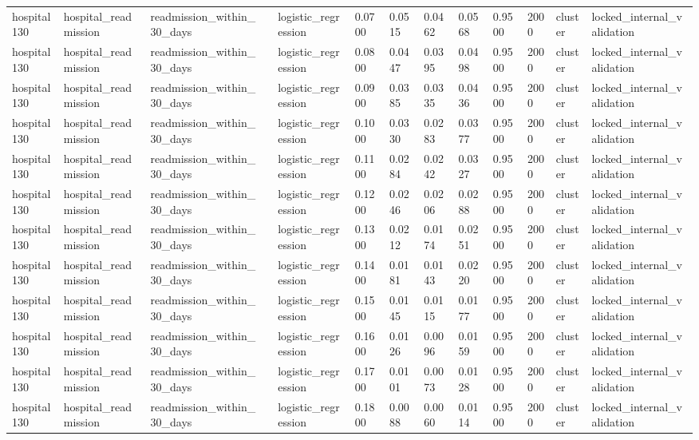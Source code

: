 \begin{tabular}{lllllllllllll}
hospital130 & hospital\_readmission & readmission\_within\_30\_days &  & logistic\_regression & 0.0700 & 0.0515 & 0.0462 & 0.0568 & 0.9500 & 2000 & cluster & locked\_internal\_validation \\
hospital130 & hospital\_readmission & readmission\_within\_30\_days &  & logistic\_regression & 0.0800 & 0.0447 & 0.0395 & 0.0498 & 0.9500 & 2000 & cluster & locked\_internal\_validation \\
hospital130 & hospital\_readmission & readmission\_within\_30\_days &  & logistic\_regression & 0.0900 & 0.0385 & 0.0335 & 0.0436 & 0.9500 & 2000 & cluster & locked\_internal\_validation \\
hospital130 & hospital\_readmission & readmission\_within\_30\_days &  & logistic\_regression & 0.1000 & 0.0330 & 0.0283 & 0.0377 & 0.9500 & 2000 & cluster & locked\_internal\_validation \\
hospital130 & hospital\_readmission & readmission\_within\_30\_days &  & logistic\_regression & 0.1100 & 0.0284 & 0.0242 & 0.0327 & 0.9500 & 2000 & cluster & locked\_internal\_validation \\
hospital130 & hospital\_readmission & readmission\_within\_30\_days &  & logistic\_regression & 0.1200 & 0.0246 & 0.0206 & 0.0288 & 0.9500 & 2000 & cluster & locked\_internal\_validation \\
hospital130 & hospital\_readmission & readmission\_within\_30\_days &  & logistic\_regression & 0.1300 & 0.0212 & 0.0174 & 0.0251 & 0.9500 & 2000 & cluster & locked\_internal\_validation \\
hospital130 & hospital\_readmission & readmission\_within\_30\_days &  & logistic\_regression & 0.1400 & 0.0181 & 0.0143 & 0.0220 & 0.9500 & 2000 & cluster & locked\_internal\_validation \\
hospital130 & hospital\_readmission & readmission\_within\_30\_days &  & logistic\_regression & 0.1500 & 0.0145 & 0.0115 & 0.0177 & 0.9500 & 2000 & cluster & locked\_internal\_validation \\
hospital130 & hospital\_readmission & readmission\_within\_30\_days &  & logistic\_regression & 0.1600 & 0.0126 & 0.0096 & 0.0159 & 0.9500 & 2000 & cluster & locked\_internal\_validation \\
hospital130 & hospital\_readmission & readmission\_within\_30\_days &  & logistic\_regression & 0.1700 & 0.0101 & 0.0073 & 0.0128 & 0.9500 & 2000 & cluster & locked\_internal\_validation \\
hospital130 & hospital\_readmission & readmission\_within\_30\_days &  & logistic\_regression & 0.1800 & 0.0088 & 0.0060 & 0.0114 & 0.9500 & 2000 & cluster & locked\_internal\_validation \\

\end{tabular}
